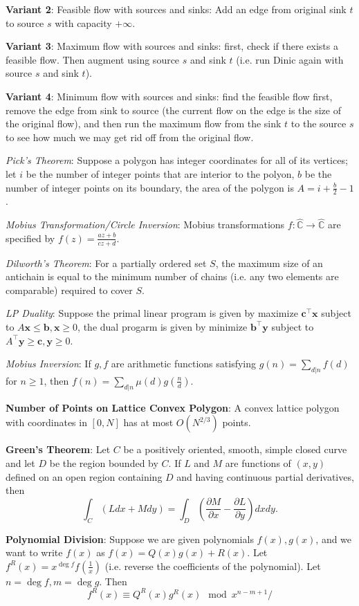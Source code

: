 \textbf{Variant 2}: Feasible flow with sources and sinks: Add an edge from original sink $t$ to source $s$ with capacity $+\infty$.

\textbf{Variant 3}: Maximum flow with sources and sinks: first, check if there exists a feasible flow. Then augment using source $s$ and sink $t$ (i.e. run Dinic again with source $s$ and sink $t$).

\textbf{Variant 4}: Minimum flow with sources and sinks: find the feasible flow first, remove the edge from sink to source (the current flow on the edge is the size of the original flow), and then run the maximum flow from the sink $t$ to the source $s$ to see how much we may get rid off from the original flow.

\emph{Pick's Theorem}: Suppose a polygon has integer coordinates for all of its vertices; let $i$ be the number of integer points that are interior to the polyon, $b$ be the number of integer points on its boundary, the area of the polygon is $A = i + \frac{b}{2}-1$.

\emph{Mobius Transformation/Circle Inversion}: Mobius transformations $f: \hat{\mathbb{C}} \rightarrow \hat{\mathbb{C}}$ are specified by $f(z) = \frac{az+b}{cz+d}$.

\emph{Dilworth's Theorem}: For a partially ordered set $S$, the maximum size of an antichain is equal to the minimum number of chains (i.e. any two elements are comparable) required to cover $S$.

\emph{LP Duality}: Suppose the primal linear program is given by maximize $\mathbf{c}^\top \mathbf{x}$ subject to $A\mathbf{x} \leq \mathbf{b}, \mathbf{x} \geq 0$, the dual progarm is given by minimize $\mathbf{b}^\top \mathbf{y}$ subject to $A^\top \mathbf{y} \geq \mathbf{c}, \mathbf{y} \geq 0$.

\emph{Mobius Inversion}: If $g,f$ are arithmetic functions satisfying $\displaystyle g(n) = \sum_{d | n}f(d)$ for $n \geq 1$, then $\displaystyle f(n) = \sum_{d|n}\mu(d)g(\frac{n}{d})$.

\textbf{Number of Points on Lattice Convex Polygon}: A convex lattice polygon with coordinates in $[0,N]$ has at most $O(N^{2/3})$ points.

\textbf{Green's Theorem}: Let $C$ be a positively oriented, smooth, simple closed curve and let $D$ be the region bounded by $C$. If $L$ and $M$ are functions of $(x,y)$ defined on an open region containing $D$ and having continuous partial derivatives, then
\begin{equation*}
  \int_C (Ldx + Mdy) = \int_D(\frac{\partial M}{\partial x}-\frac{\partial L}{\partial y}) dxdy.
\end{equation*}

\textbf{Polynomial Division}: Suppose we are given polynomials $f(x), g(x)$, and we want to write $f(x)$ as $f(x) = Q(x)g(x) + R(x)$. Let $f^R(x) = x^{\deg f}f(\frac{1}{x})$ (i.e. reverse the coefficients of the polynomial). Let $n = \deg f, m = \deg g$. Then
\begin{equation*}
  f^R(x) \equiv Q^R(x) g^R(x) \mod x^{n-m+1}/
\end{equation*}

